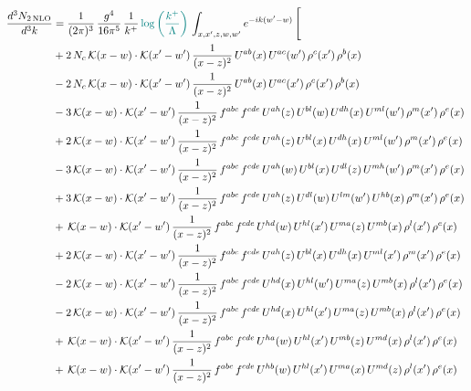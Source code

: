 \documentclass[9pt]{article}
\numberwithin{equation}{section}
\begin{document}
\begin{align}
\frac{d^{3}N_{2\,\mathrm{NLO}}}{d^{3}k} & = \frac{1}{(2\pi)^{3}}\,\frac{g^{4}}{16\pi^{5}}\,\frac{1}{k^{+}}\,{\color{teal}\log{\left(\frac{k^{+}}{\Lambda}\right)}}\,\int_{x,x',z,w,w'}e^{-ik(w'-w)}\,\Bigg[
\notag\\ &+2\,N_{c}\,\mathcal{K}(x-w)\cdot\mathcal{K}(x'-w')\,\frac{1}{(x-z)^{2}}\,U^{ab}(x)\,U^{ac}(w')\,\rho^{c}(x')\,\rho^{b}(x)\notag\\
&-2\,N_{c}\,\mathcal{K}(x-w)\cdot\mathcal{K}(x'-w')\,\frac{1}{(x-z)^{2}}\,U^{ab}(x)\,U^{ac}(x')\,\rho^{c}(x')\,\rho^{b}(x)\notag\\
&-3\,\mathcal{K}(x-w)\cdot\mathcal{K}(x'-w')\,\frac{1}{(x-z)^{2}}\,f^{abc}\,f^{cde}\,U^{ah}(z)\,U^{bl}(w)\,U^{dh}(x)\,U^{ml}(w')\,\rho^{m}(x')\,\rho^{e}(x)\notag\\
&+2\,\mathcal{K}(x-w)\cdot\mathcal{K}(x'-w')\,\frac{1}{(x-z)^{2}}\,f^{abc}\,f^{cde}\,U^{ah}(z)\,U^{bl}(x)\,U^{dh}(x)\,U^{ml}(w')\,\rho^{m}(x')\,\rho^{e}(x)\notag\\
&-3\,\mathcal{K}(x-w)\cdot\mathcal{K}(x'-w')\,\frac{1}{(x-z)^{2}}\,f^{abc}\,f^{cde}\,U^{ah}(w)\,U^{bl}(x)\,U^{dl}(z)\,U^{mh}(w')\,\rho^{m}(x')\,\rho^{e}(x)\notag\\
&+3\,\mathcal{K}(x-w)\cdot\mathcal{K}(x'-w')\,\frac{1}{(x-z)^{2}}\,f^{abc}\,f^{cde}\,U^{ah}(z)\,U^{dl}(w)\,U^{lm}(w')\,U^{hb}(x)\,\rho^{m}(x')\,\rho^{e}(x)\notag\\
&+\,\mathcal{K}(x-w)\cdot\mathcal{K}(x'-w')\,\frac{1}{(x-z)^{2}}\,f^{abc}\,f^{cde}\,U^{hd}(w)\,U^{hl}(x')\,U^{ma}(z)\,U^{mb}(x)\,\rho^{l}(x')\,\rho^{e}(x)\notag\\
&+2\,\mathcal{K}(x-w)\cdot\mathcal{K}(x'-w')\,\frac{1}{(x-z)^{2}}\,f^{abc}\,f^{cde}\,U^{ah}(z)\,U^{bl}(x)\,U^{dh}(x)\,U^{ml}(x')\,\rho^{m}(x')\,\rho^{e}(x)\notag\\
&-2\,\mathcal{K}(x-w)\cdot\mathcal{K}(x'-w')\,\frac{1}{(x-z)^{2}}\,f^{abc}\,f^{cde}\,U^{hd}(x)\,U^{hl}(w')\,U^{ma}(z)\,U^{mb}(x)\,\rho^{l}(x')\,\rho^{e}(x)\notag\\
&-2\,\mathcal{K}(x-w)\cdot\mathcal{K}(x'-w')\,\frac{1}{(x-z)^{2}}\,f^{abc}\,f^{cde}\,U^{hd}(x)\,U^{hl}(x')\,U^{ma}(z)\,U^{mb}(x)\,\rho^{l}(x')\,\rho^{e}(x)\notag\\
&+\,\mathcal{K}(x-w)\cdot\mathcal{K}(x'-w')\,\frac{1}{(x-z)^{2}}\,f^{abc}\,f^{cde}\,U^{ha}(w)\,U^{hl}(x')\,U^{mb}(z)\,U^{md}(x)\,\rho^{l}(x')\,\rho^{e}(x)\notag\\
&+\,\mathcal{K}(x-w)\cdot\mathcal{K}(x'-w')\,\frac{1}{(x-z)^{2}}\,f^{abc}\,f^{cde}\,U^{hb}(w)\,U^{hl}(x')\,U^{ma}(x)\,U^{md}(z)\,\rho^{l}(x')\,\rho^{e}(x)\notag\\

\end{align}
\end{document}

